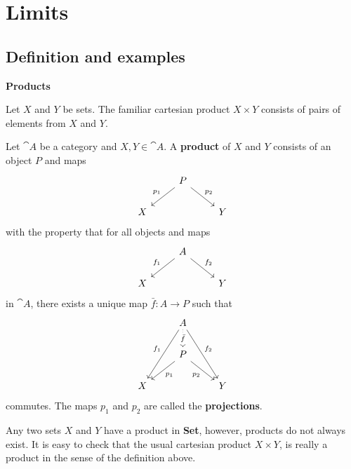 \section{Limits}
\subsection{Definition and examples}
\begin{center}
    \textbf{Products}
\end{center}
Let $X$ and $Y$ be sets. The familiar cartesian product $X\times Y$ consists of pairs of elements from $X$ and $Y$.

\begin{definition}
    Let $\cat{A}$ be a category and $X,Y\in\cat{A}$. A \textbf{product} of $X$ and $Y$ consists of an object $P$ and maps
    \begin{equation*}
    \begin{tikzcd}
        & P \arrow[dl, "p_1"'] \arrow[dr, "p_2"] \\
        X && Y
    \end{tikzcd}
    \end{equation*}
    with the property that for all objects and maps
    \begin{equation*}
    \begin{tikzcd}
        & A \arrow[dl, "f_1"'] \arrow[dr, "f_2"] \\
        X && Y
    \end{tikzcd}
    \end{equation*}
    in $\cat{A}$, there exists a unique map $\bar{f}:A\to P$ such that
    \begin{equation*}
    \begin{tikzcd}
        & A \arrow[ddl, "f_1"'] \arrow[ddr, "f_2"] \arrow[d, dotted, "\bar{f}" description] \\
        & P \arrow[dl, "p_1"] \arrow[dr, "p_2"'] \\
        X && Y
    \end{tikzcd}
    \end{equation*}
    commutes. The maps $p_1$ and $p_2$ are called the \textbf{projections}.
\end{definition}

\begin{example}
    Any two sets $X$ and $Y$ have a product in \textbf{Set}, however, products do not always exist. It is easy to check that the usual cartesian product $X\times Y$, is really a product in the sense of the definition above.
\end{example}

